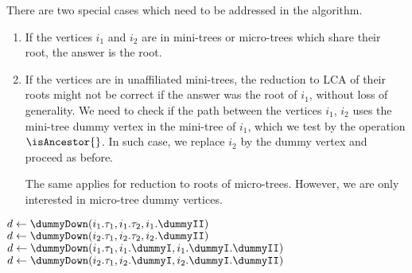 There are two special cases which need to be addressed in the algorithm.
\begin{enumerate}
	\item If the vertices $i_1$ and $i_2$ are in mini-trees or micro-trees which share their root, the answer is the root.
	
	\item If the vertices are in unaffiliated mini-trees, the reduction to LCA of their roots might not be correct if the answer was the root of $i_1$, without loss of generality.
	We need to check if the path between the vertices $i_1$, $i_2$ uses the mini-tree dummy vertex in the mini-tree of $i_1$, which we test by the operation $\isAncestor{}$.
	In such case, we replace $i_2$ by the dummy vertex and proceed as before.
	
	The same applies for reduction to roots of micro-trees.
	However, we are only interested in micro-tree dummy vertices.
\end{enumerate}

\begin{algorithm}[tp]
\begin{algorithmic}
	 
		 
			\State {}
		 
			\State {} 
		\Else {}
				\State $d \gets \dummyDown(i_1.\tau_1, i_1.\tau_2, i_1.\dummyII)$
				 
					\State {} 
				\EndIf
			\EndIf
			  
				\State $d \gets \dummyDown(i_2.\tau_1, i_2.\tau_2, i_2.\dummyII)$
					\State {}
				\EndIf
			\EndIf
			\State {}
		\EndIf
	 
		\State {} 
	\Else {}
			\State $d \gets \dummyDown(i_1.\tau_1, i_1.\dummyI, i_1.\dummyI.\dummyII)$
			 
				\State {} 
			\EndIf
		\EndIf
		 
			\State $d \gets \dummyDown(i_2.\tau_1, i_2.\dummyI, i_2.\dummyI.\dummyII)$
				\State {}
			\EndIf
		\EndIf
		\State {}
	\EndIf
\EndFunction
\end{algorithmic}
\end{algorithm}

